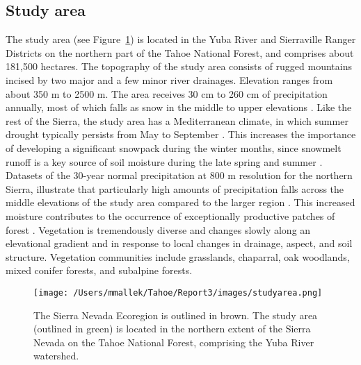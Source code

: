 \subsection*{Study area}
The study area (see Figure~\ref{projectarea-ch3}) is located in the Yuba River and Sierraville Ranger Districts on the northern part of the Tahoe National Forest, and comprises about 181,500 hectares. The topography of the study area consists of rugged mountains incised by two major and a few minor river drainages. Elevation ranges from about 350 m to 2500 m. The area receives 30 cm to 260 cm of precipitation annually, most of which falls as snow in the middle to upper elevations \citep{Storer1963}. Like the rest of the Sierra, the study area has a Mediterranean climate, in which summer drought typically persists from May to September \citep{Minnich2007}. This increases the importance of developing a significant snowpack during the winter months, since snowmelt runoff is a key source of soil moisture during the late spring and summer \citep{Skinner1996}. Datasets of the 30-year normal precipitation at 800 m resolution for the northern Sierra, illustrate that particularly high amounts of precipitation falls across the middle elevations of the study area compared to the larger region \citep{PRISMClimateGroup2004}. This increased moisture contributes to the occurrence of exceptionally productive patches of forest \citep{Littell2012}. Vegetation is tremendously diverse and changes slowly along an elevational gradient and in response to local changes in drainage, aspect, and soil structure. Vegetation communities include grasslands, chaparral, oak woodlands, mixed conifer forests, and subalpine forests.

\begin{figure}
\centering
\texttt{[image: /Users/mmallek/Tahoe/Report3/images/studyarea.png]}
\caption{The Sierra Nevada Ecoregion is outlined in brown. The study area (outlined in green) is located in the northern extent of the Sierra Nevada on the Tahoe National Forest, comprising the Yuba River watershed.}
\label{projectarea-ch3}
\end{figure}

